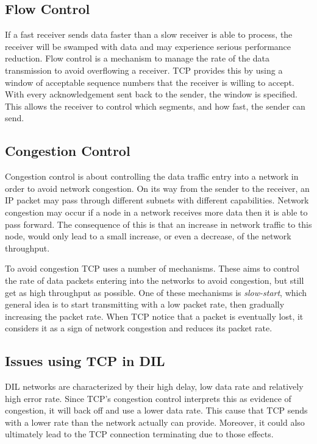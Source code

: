 \subsection{Flow Control}

If a fast receiver sends data faster than a slow receiver is able to process,
the receiver will be swamped with data and may experience serious performance
reduction. Flow control is a mechanism to manage the rate of the data
transmission to avoid overflowing a receiver. TCP provides this by using a
window of acceptable sequence numbers that the receiver is willing to accept.
With every acknowledgement sent back to the sender, the window is specified.
This allows the receiver to control which segments, and how fast, the sender
can send.

\subsection{Congestion Control}

Congestion control is about controlling the data traffic entry into a network in
order to avoid network congestion. On its way from the sender to the receiver,
an IP packet may pass through different subnets with different capabilities.
Network congestion may occur if a node in a network receives more data then it
is able to pass forward. The consequence of this is that an increase in network
traffic to this node, would only lead to a small increase, or even a decrease,
of the network throughput\cite{Al-Bahadili2012}.

To avoid congestion TCP uses a number of mechanisms. These aims to control the
rate of data packets entering into the networks to avoid congestion, but still
get as high throughput as possible. One of these mechanisms is
\textit{slow-start}, which general idea is to start transmitting with a low
packet rate, then gradually increasing the packet rate. When TCP notice that a
packet is eventually lost, it considers it as a sign of network congestion and
reduces its packet rate.

\subsection{Issues using TCP in DIL}
\label{section:tcp-problems}

DIL networks are characterized by their high delay, low data rate and relatively
high error rate. Since TCP's congestion control interprets this as evidence of
congestion, it will back off and use a lower data rate. This cause that TCP
sends with a lower rate than the network actually can provide. Moreover, it
could also ultimately lead to the TCP connection terminating due to those
effects\cite{nato-disadvantaged-grids}.


